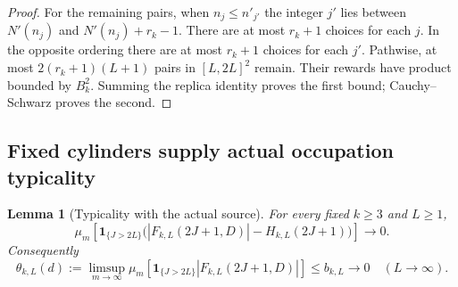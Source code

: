 \documentclass[11pt]{amsart}
\newtheorem{lemma}[theorem]{Lemma}
\theoremstyle{definition}
\theoremstyle{remark}
\newcommand{\one}{\mathbf 1}
\begin{document}
\begin{proof}
For the remaining pairs, when $n_j\le n'_{j'}$ the integer $j'$
lies between $N'(n_j)$ and $N'(n_j)+r_k-1$. There are at most
$r_k+1$ choices for each $j$. In the opposite ordering there are at
most $r_k+1$ choices for each $j'$. Pathwise, at most
$2(r_k+1)(L+1)$ pairs in $[L,2L]^2$ remain. Their rewards have
product bounded by $B_k^2$. Summing the replica identity proves the
first bound; Cauchy--Schwarz proves the second.
\end{proof}

\subsection{Fixed cylinders supply actual occupation typicality}

\begin{lemma}[Typicality with the actual source]\label{clk:typicality}
For every fixed $k\ge3$ and $L\ge1$,
\begin{equation}\label{clk:typ}
 \mu_m\!\left[\one_{\{J>2L\}}
   \bigl(|F_{k,L}(2J+1,D)|-H_{k,L}(2J+1)\bigr)\right]
                  \longrightarrow0.
\end{equation}
Consequently
\begin{equation}\label{clk:theta}
 \theta_{k,L}(d):=\limsup_{m\to\infty}
       \mu_m[\one_{\{J>2L\}}|F_{k,L}(2J+1,D)|]
         \le b_{k,L}\longrightarrow0\quad(L\to\infty).
\end{equation}
\end{lemma}
\end{document}
